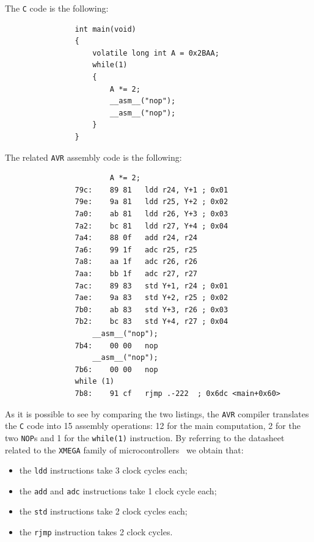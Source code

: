             \noindent The \texttt{C} code is the following:
            
            \begin{verbatim}
                int main(void)
                {
                    volatile long int A = 0x2BAA;
                    while(1)
                    {
                        A *= 2;
                        __asm__("nop");
                        __asm__("nop");
                    }
                }
            \end{verbatim}

            \noindent The related \texttt{AVR} assembly code is the following:

            \begin{verbatim}
                        A *= 2;
                79c:	89 81   ldd r24, Y+1 ; 0x01
                79e:	9a 81   ldd r25, Y+2 ; 0x02
                7a0:	ab 81   ldd r26, Y+3 ; 0x03
                7a2:	bc 81   ldd r27, Y+4 ; 0x04
                7a4:	88 0f   add r24, r24
                7a6:	99 1f   adc r25, r25
                7a8:	aa 1f   adc r26, r26
                7aa:	bb 1f   adc r27, r27
                7ac:	89 83   std Y+1, r24 ; 0x01
                7ae:	9a 83   std Y+2, r25 ; 0x02
                7b0:	ab 83   std Y+3, r26 ; 0x03
                7b2:	bc 83   std Y+4, r27 ; 0x04
                    __asm__("nop");
                7b4:	00 00   nop
                    __asm__("nop");
                7b6:	00 00   nop
                while (1)
                7b8:	91 cf   rjmp .-222  ; 0x6dc <main+0x60>
            \end{verbatim}

            \noindent As it is possible to see by comparing the two listings, the \texttt{AVR} compiler translates the \texttt{C} code into 15 assembly operations: 12 for the main computation, 2 for the two \texttt{NOP}s and 1 for the \texttt{while(1)} instruction. By referring to the datasheet related to the \texttt{XMEGA} family of microcontrollers~\cite{xmega} we obtain that:

            \begin{itemize}
                \item the \texttt{ldd} instructions take 3 clock cycles each;
                \item the \texttt{add} and \texttt{adc} instructions take 1 clock cycle each;
                \item the \texttt{std} instructions take 2 clock cycles each;
                \item the \texttt{rjmp} instruction takes 2 clock cycles.
            \end{itemize}

